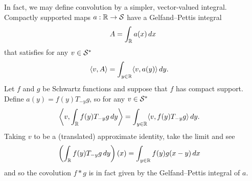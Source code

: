     In fact, we may define convolution by a simpler, vector-valued integral.
    Compactly supported  maps $a:\mathbb{R}\rightarrow\mathcal{S}$ have a Gelfand--Pettis integral 
    \begin{align*}
      A = \int_\mathbb{R} a(x)\,dx
    \end{align*}
    that satisfies for any $v\in\mathcal{S}^*$
    \begin{align*}
      \langle v, A\rangle
      &= \int_{y\in\mathbb{R}} \langle v, a(y)\rangle\,dy \text{.}
    \end{align*}
    Let $f$ and $g$ be Schwartz functions and suppose that $f$ has compact support.
    Define $a(y)=f(y)T_{-y}g$, so for any $v\in\mathcal{S}^*$
    \begin{align*}
      \left\langle v, \int_{\mathbb{R}} f(y)T_{-y}g\,dy \right\rangle
      &= \int_{y\in\mathbb{R}} \langle v, f(y)T_{-y}g\rangle\, dy \text{.}
    \end{align*}
    Taking $v$ to be a (translated) approximate identity, take the limit and see
    \begin{align*}
      \left( \int_{\mathbb{R}} f(y)T_{-y}g\,dy \right)(x)
      &= \int_{y\in\mathbb{R}} f(y)g(x-y)\,dx
    \end{align*}
    and so the covolution $f*g$ is in fact given by the Gelfand--Pettis integral of $a$.
    
